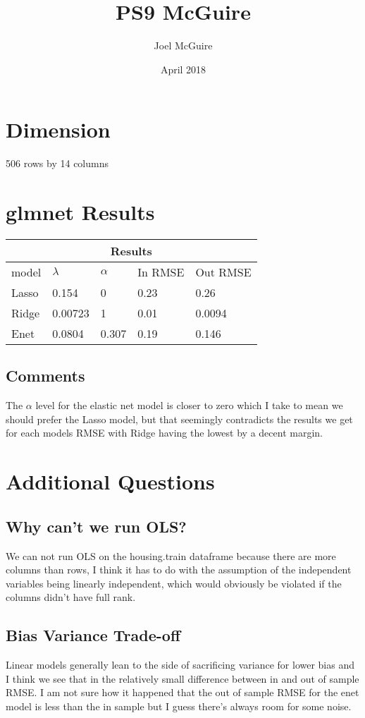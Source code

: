 \documentclass{article}
\title{PS9 McGuire}
\author{Joel McGuire}
\date{April 2018}
\begin{document}
\maketitle

\section{Dimension}
506 rows by 14 columns

\section{glmnet Results }

\begin{tabular}{|p{1.5cm}||p{1.5cm}|p{1.5cm}|p{1.5cm}| p{2.0cm} | }
 \hline
 \multicolumn{5}{|c|}{Results} \\
 \hline
  model & $\lambda$ & $\alpha$  & In RMSE & Out RMSE \\
 \hline
 Lasso  & 0.154   & 0     &  0.23 & 0.26 \\
 Ridge  & 0.00723 & 1     & 0.01  & 0.0094  \\
 Enet   & 0.0804  & 0.307 &  0.19 & 0.146 \\
 
 \hline
\end{tabular}

\subsection{Comments}
The $\alpha$ level for the elastic net model is closer to zero which I take to mean we should prefer the Lasso model, but that seemingly contradicts the results we get for each models RMSE with Ridge having the lowest by a decent margin. 

\section{Additional Questions}
\subsection{Why can't we run OLS? }
We can not run OLS on the housing.train dataframe because there are more columns than rows, I think it has to do with the assumption of the independent variables being linearly independent, which would obviously be violated if the columns didn't have full rank. 

\subsection{Bias Variance Trade-off}

Linear models generally lean to the side of sacrificing variance for lower bias and I think we see that in the relatively small difference between in and out of sample RMSE. I am not sure how it happened that the out of sample RMSE for the enet model is less than the in sample but I guess there's always room for some noise. 
\end{document}
